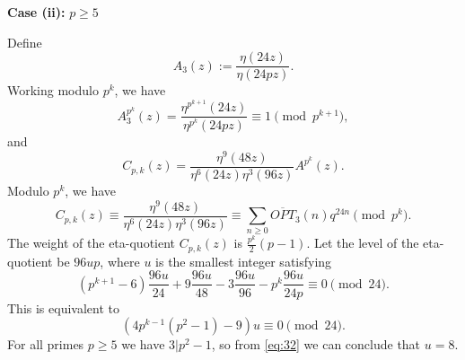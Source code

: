 \documentclass[12pt,reqno]{amsart}
\numberwithin{equation}{section}
\newcommand{\opt}{\overline{OPT}}
\begin{document}
\textbf{Case (ii):} $p\geq5$

  Define 
  \[A_3(z):=\frac{\eta(24z)}{\eta(24pz)}.
  \]
  Working modulo $p^k$, we have  
  \[
    A_3^{p^k}(z)=\frac{\eta^{p^{k+1}}(24z)}{\eta^{p^k}(24pz)}\equiv 1 \pmod{p^{k+1}},
    \]
    and
    \[
    C_{p,k}(z)=\frac{\eta^9(48z)}{\eta^6(24z)\eta^3(96z)}A^{p^k}(z).
    \]
    Modulo $p^{k}$, we have
    \[
    C_{p,k}(z)\equiv \frac{\eta^9(48z)}{\eta^6(24z)\eta^3(96z)}\equiv \sum_{n\geq 0}\opt_3(n)q^{24n}\pmod{p^k}.
    \]
    The weight of the eta-quotient $C_{p,k}(z)$ is $\frac{p^k}{2}(p-1)$. Let the level of the eta-quotient be $96up$, where $u$ is the smallest integer satisfying
    \[
    (p^{k+1}-6)\frac{96u}{24}+ 9\frac{96u}{48}-3\frac{96u}{96}-p^k\frac{96u}{24p}\equiv 0 \pmod{24}.
    \]
    This is equivalent to
    \begin{equation}\label{eq:32}
      ( 4p^{k-1}(p^{2}-1)-9)u\equiv 0 \pmod{24}.
    \end{equation}
    For all primes $p\geq 5$ we have $3|p^{2}-1$, so from \eqref{eq:32} we can conclude that $u=8$.
\end{document}
